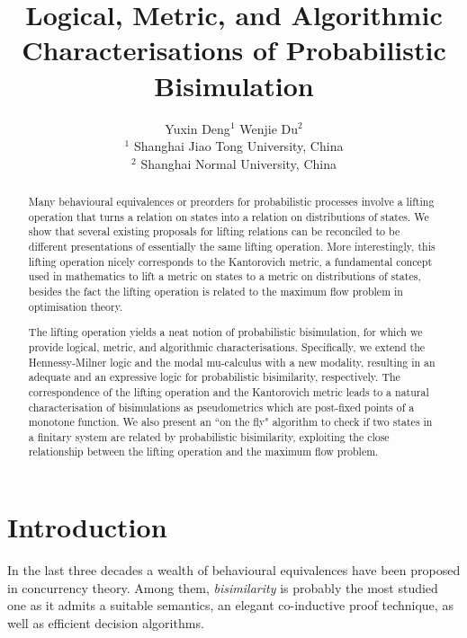 \documentclass{article}
\begin{document}
\title{Logical, Metric, and Algorithmic\\ Characterisations of Probabilistic Bisimulation}
\author{
Yuxin Deng$^{1}$ \qquad Wenjie Du$^2$\\
$^1$ Shanghai Jiao Tong University, China\\
$^2$ Shanghai Normal University, China}
\maketitle

\begin{abstract}
Many behavioural equivalences or preorders for probabilistic
processes involve a lifting operation that turns a relation on
states into a relation on distributions of states. We show that
several existing proposals for lifting relations can be reconciled
to be different presentations of essentially the same lifting
operation. More interestingly, this lifting operation nicely
corresponds to the Kantorovich metric, a fundamental concept used in
mathematics to lift a metric on states to a metric on distributions
of states, besides the fact the lifting operation is related to the
maximum flow problem in optimisation theory.

The lifting operation yields a neat notion of probabilistic
bisimulation, for which we provide logical, metric, and algorithmic
characterisations. Specifically, we extend the Hennessy-Milner logic
and the modal mu-calculus with a new modality, resulting in an
adequate and an expressive logic for probabilistic bisimilarity,
respectively. The correspondence of the lifting operation and the
Kantorovich metric leads to a natural characterisation of
bisimulations as pseudometrics which are post-fixed points of a
monotone function. We also present an ``on the fly" algorithm to
check if two states in a finitary system are related by
probabilistic bisimilarity, exploiting the close relationship
between the lifting operation and the maximum flow problem.
\end{abstract}

\section{Introduction}
In the last three decades a wealth of behavioural equivalences have
been proposed in concurrency theory. Among them, \emph{bisimilarity}
\cite{Mil89a,Par81} is probably the most studied one as it admits a
suitable semantics, an elegant co-inductive proof technique, as well
as efficient decision algorithms.
\end{document}
